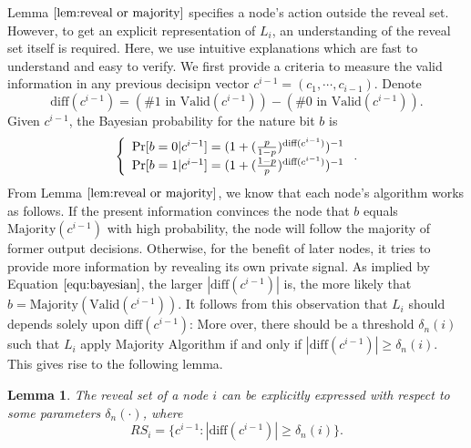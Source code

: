 \documentclass[a4paper,UKenglish]{lipics}
\newtheorem{lem}[thm]{Lemma}
\theoremstyle{definition}
\newcommand{\diff}{\text{diff}}
\begin{document}
Lemma $\ref{lem:reveal or majority}$ specifies a node's action outside the reveal set.
However, to get an explicit representation of $L_i$, an understanding of the reveal set itself is required.
Here, we use intuitive explanations which are fast to understand and easy to verify.
We first provide a criteria to measure the valid information in any previous decisipn vector $c^{i-1} = (c_1, \dotsb, c_{i-1})$.
Denote
\begin{equation*}
	\diff(c^{i-1}) 
	= 
	(\text{\# 1 in }\text{Valid}(c^{i-1})) - (\text{\# 0 in }\text{Valid}(c^{i-1})).
\end{equation*}
Given $c^{i-1}$, the Bayesian probability for the nature bit $b$ is 
\begin{equation}
\label{equ:bayesian}
\left\{
\begin{array} {l}
	\Pr[b = 0|c^{i-1}]
	= 
	(1 + ({p\over 1-p})^{\diff(c^{i-1})})^{-1}
\\
	\Pr[b = 1|c^{i-1}] 
	= 
	(1 + ({1-p\over p})^{\diff(c^{i-1})})^{-1} 
\end{array}
\right..
\end{equation}
From Lemma $\ref{lem:reveal or majority}$, we know that each node's algorithm works as follows.
If the present information convinces the node that $b$ equals $\text{Majority}(c^{i-1})$ with high probability, the node will follow the majority of former output decisions.
Otherwise, for the benefit of later nodes, it tries to provide more information by revealing its own private signal.
As implied by Equation $\eqref{equ:bayesian}$, the larger $|\diff(c^{i-1})|$ is, the more likely that $b = \text{Majority}(\text{Valid}(c^{i-1}))$. 
It follows from this observation that $L_i$ should depends solely upon $\diff(c^{i-1})$:
More over, there should be a threshold $\delta_n(i)$ such that $L_i$ apply Majority Algorithm if and only if $|\diff(c^{i-1})| \ge \delta_n(i)$. 
This gives rise to the following lemma.

\begin{lem}
\label{lem:reveal set threshold}
The reveal set of a node $i$ can be explicitly expressed with respect to some parameters $\delta_n(\cdot)$, where
\begin{equation*}
	RS_i 
= 
	\{ c^{i-1} :|\diff(c^{i-1})| \ge \delta_n(i) \}.
\end{equation*}
\end{lem}
\end{document}
